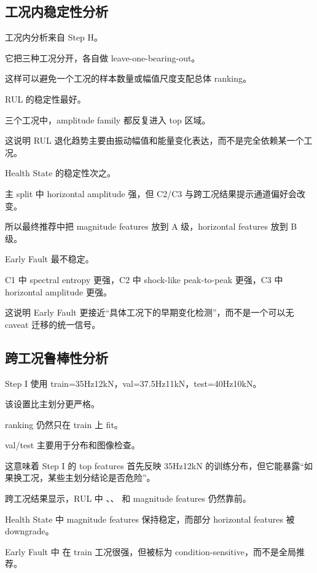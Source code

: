 \subsection{工况内稳定性分析}

工况内分析来自 Step H。

它把三种工况分开，各自做 leave-one-bearing-out。

这样可以避免一个工况的样本数量或幅值尺度支配总体 ranking。



RUL 的稳定性最好。

三个工况中，amplitude family 都反复进入 top 区域。

这说明 RUL 退化趋势主要由振动幅值和能量变化表达，而不是完全依赖某一个工况。

Health State 的稳定性次之。

主 split 中 horizontal amplitude 强，但 C2/C3 与跨工况结果提示通道偏好会改变。

所以最终推荐中把 magnitude features 放到 A 级，horizontal features 放到 B 级。

Early Fault 最不稳定。

C1 中 spectral entropy 更强，C2 中 shock-like peak-to-peak 更强，C3 中 horizontal amplitude 更强。

这说明 Early Fault 更接近“具体工况下的早期变化检测”，而不是一个可以无 caveat 迁移的统一信号。

\subsection{跨工况鲁棒性分析}

Step I 使用 train=35Hz12kN，val=37.5Hz11kN，test=40Hz10kN。

该设置比主划分更严格。

ranking 仍然只在 train 上 fit。

val/test 主要用于分布和图像检查。

这意味着 Step I 的 top features 首先反映 35Hz12kN 的训练分布，但它能暴露“如果换工况，某些主划分结论是否危险”。

跨工况结果显示，RUL 中 、、 和 magnitude features 仍然靠前。

Health State 中 magnitude features 保持稳定，而部分 horizontal features 被 downgrade。

Early Fault 中  在 train 工况很强，但被标为 condition-sensitive，而不是全局推荐。

